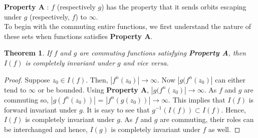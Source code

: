 \documentclass[a4paper,12pt]{amsart}
\newcommand{\ity}{\infty}
\numberwithin{equation}{section}
\newtheorem{theorem}{Theorem}[section]
\begin{document}

\textbf{Property A} : $f$ (respectively $g$) has the property that it sends orbits escaping under $g$ (respectively, $f$) to $\ity.$\\

To begin with the commuting entire functions, we first understand the nature of these sets when functions satisfies \textbf{Property A}.

\begin{theorem} \label{Complete_invar_esp}
If $f$ and $g$ are commuting functions satisfying \textbf{Property A}, then $I(f)$ is completely invariant under $g$ and vice versa. 
\end{theorem}
\begin{proof}
Suppose $z_{0} \in I(f).$
Then, $|f^{n}(z_{0})| \rightarrow \infty$.
Now $|g(f^{n}(z_{0})|$ can either tend to $\infty$ or be bounded. Using  \textbf{Property A}, $|g(f^{n}(z_{0})| \rightarrow \infty $.
As $f$ and $g$ are commuting so, $|g(f^{n}(z_{0}))|$ = $|f^{n}(g(z_{0}))| \rightarrow \infty.$
This implies that  $I(f)$ is forward invariant under $g$.
It is easy to see that $g^{-1}(I(f))\subset I(f)$. 
Hence,  $I(f)$ is completely invariant under $g$. As $f$ and $g$ are commuting, their roles can be interchanged and hence, $I(g)$ is completely invariant under $f$ as well. 
\end{proof}
\end{document}
